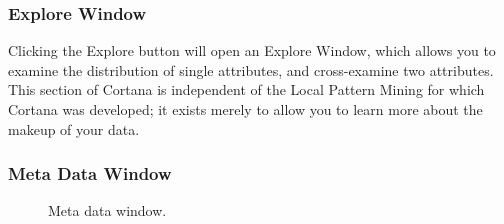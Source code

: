 \documentclass{article}
\begin{document}

\subsubsection{Explore Window}

Clicking the Explore button will open an Explore Window, which allows you to
examine the distribution of single attributes, and cross-examine two
attributes.  This section of Cortana is independent of the Local Pattern
Mining for which Cortana was developed; it exists merely to allow you to
learn more about the makeup of your data.

\subsubsection{Meta Data Window}
\label{sec:metadata}

\begin{figure}
\begin{center}
\centering
{}
\caption{Meta data window.}
\end{center}
\label{fig:metadatawindow}
\end{figure}
\end{document}

